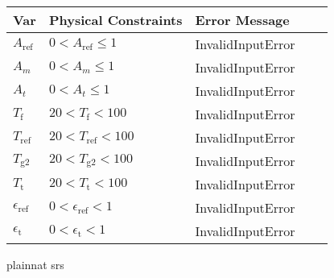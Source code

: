 \documentclass[12pt, titlepage]{article}
\begin{document}
\begin{table}[!h]
  \caption{Possible errors for input} \label{verify_input}
  \renewcommand{\arraystretch}{1.2}
\noindent \begin{longtable*}{l l l l c} 
  \toprule
  \textbf{Var} & \textbf{Physical Constraints} & \textbf{Error Message} \\
  \midrule 

 $A_\text{ref}$ & $0 < A_\text{ref} \le 1$ & InvalidInputError \\
  $A_m$ & $0 < A_m \le 1 $ & InvalidInputError \\
  $A_t$ & $0 < A_t \le 1 $ & InvalidInputError \\
  $T_\text{f}$ & $20 < T_\text{f} < 100$ & InvalidInputError\\
  $T_\text{ref}$ & $20 < T_\text{ref} < 100$ &InvalidInputError \\
  $T_\text{g2}$ & $20 < T_\text{g2} < 100$ &InvalidInputError \\
  $T_\text{t}$ & $20 < T_\text{t} < 100$ & InvalidInputError\\
  $\epsilon_\text{ref}$ & $0 < \epsilon_\text{ref} < 1$ & InvalidInputError\\
   $\epsilon_\text{t}$ & $0 < \epsilon_\text{t} < 1$ & InvalidInputError \\
  
  \bottomrule
\end{longtable*}
\end{table}

 {plainnat}
 {srs}
\end{document}

